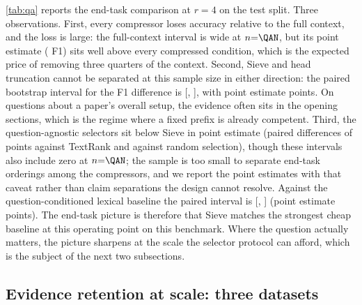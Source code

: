 \documentclass[preprint,12pt]{elsarticle}
\theoremstyle{remark}
\newcommand{\method}{Sieve}
\begin{document}
\autoref{tab:qa} reports the end-task comparison at $r=4$ on the test
split. Three observations. First, every compressor loses accuracy
relative to the full context, and the loss is large: the full-context
interval is wide at $n{=}\QAN$, but its point estimate (\QAFullF{} F1)
sits well above every compressed condition, which is the expected
price of removing three quarters of the context. Second, \method{} and
head truncation cannot be separated at this sample size in either
direction: the paired bootstrap interval for the F1 difference is
[\QAPairSHLo, \QAPairSHHi], with point estimate \QAPairSH{} points. On
questions about a paper's overall setup, the evidence often sits in
the opening sections, which is the regime where a fixed prefix is
already competent. Third, the question-agnostic selectors sit below
\method{} in point estimate (paired differences of \QAPairSTR{} points
against TextRank and \QAPairSRan{} against random selection), though
these intervals also include zero at $n{=}\QAN$; the sample is too small
to separate end-task orderings among the compressors, and we report
the point estimates with that caveat rather than claim separations the
design cannot resolve.
\ifdefined\QAPairSBm Against the question-conditioned lexical
baseline the paired interval is
[\QAPairSBmLo, \QAPairSBmHi] (point estimate \QAPairSBm{} points).
\fi{} The end-task picture is therefore that
\method{} matches the strongest cheap baseline at this operating point
on this benchmark. Where the question actually matters, the picture
sharpens at the scale the selector protocol can afford, which is the
subject of the next two subsections.

\subsection{Evidence retention at scale: three datasets}
\label{sec:recall}
\end{document}
